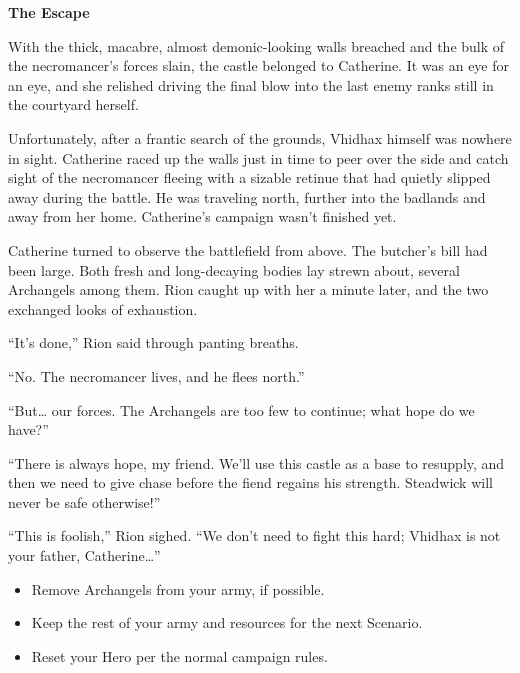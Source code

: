 \begin{multicols*}{2}
\textbf{The Escape}

With the thick, macabre, almost demonic-looking walls breached and the bulk of the necromancer's forces slain, the castle belonged to Catherine.
It was an eye for an eye, and she relished driving the final blow into the last enemy ranks still in the courtyard herself.

Unfortunately, after a frantic search of the grounds, Vhidhax himself was nowhere in sight.
Catherine raced up the walls just in time to peer over the side and catch sight of the necromancer fleeing with a sizable retinue that had quietly slipped away during the battle.
He was traveling north, further into the badlands and away from her home.
Catherine's campaign wasn't finished yet.

Catherine turned to observe the battlefield from above.
The butcher's bill had been large.
Both fresh and long-decaying bodies lay strewn about, several Archangels among them.
Rion caught up with her a minute later, and the two exchanged looks of exhaustion.

``It's done,'' Rion said through panting breaths.

``No.
The necromancer lives, and he flees north.''

``But… our forces.
The Archangels are too few to continue; what hope do we have?''

``There is always hope, my friend.
We'll use this castle as a base to resupply, and then we need to give chase before the fiend regains his strength.
Steadwick will never be safe otherwise!''

``This is foolish,'' Rion sighed.
``We don't need to fight this hard; Vhidhax is not your father, Catherine…''

\begin{itemize}
  \item \textcolor{darkcandyapplered}{Remove Archangels from your army, if possible.}
  \item \textcolor{darkcandyapplered}{Keep the rest of your army and resources for the next Scenario.}
  \item \textcolor{darkcandyapplered}{Reset your Hero per the normal campaign rules.}
\end{itemize}

\vspace{2em}
\begin{center}
\end{center}

\end{multicols*}
